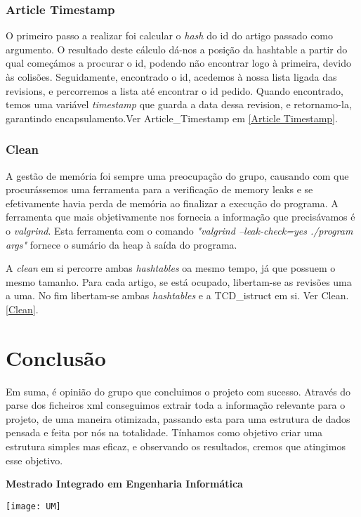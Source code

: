 \documentclass{article}
\begin{document}
\subsubsection{Article Timestamp}
\par O primeiro passo a realizar foi calcular o \emph{hash} do id do artigo passado como argumento. O resultado deste cálculo dá-nos a posição da hashtable a partir do qual começámos a procurar o id, podendo não encontrar logo à primeira, devido às colisões. Seguidamente, encontrado o id, acedemos à nossa lista ligada das revisions, e percorremos a lista até encontrar o id pedido. Quando encontrado, temos uma variável \emph{timestamp} que guarda a data dessa revision, e retornamo-la, garantindo encapsulamento.Ver Article\_Timestamp em \ref{Article Timestamp}.

\subsubsection{Clean}
\par A gestão de memória foi sempre uma preocupação do grupo, causando com que procurássemos uma ferramenta para a verificação de memory leaks e se efetivamente havia perda de memória ao finalizar a execução do programa. A ferramenta que mais objetivamente nos fornecia a informação que precisávamos é o \emph{valgrind}. Esta ferramenta com o comando \emph{"valgrind --leak-check=yes ./program args"} fornece o sumário da heap à saída do programa.
\par A \emph{clean} em si percorre ambas \emph{hashtables} oa mesmo tempo, já que possuem o mesmo tamanho. Para cada artigo, se está ocupado, libertam-se as revisões uma a uma. No fim libertam-se ambas \emph{hashtables} e a TCD\_istruct em si. Ver Clean. \ref{Clean}.

\newpage

\section{Conclusão}
\par Em suma, é opinião do grupo que concluimos o projeto com sucesso. Através do parse dos ficheiros xml conseguimos extrair toda a informação relevante para o projeto, de uma maneira otimizada, passando esta para uma estrutura de dados pensada e feita por nós na totalidade. Tínhamos como objetivo criar uma estrutura simples mas eficaz, e observando os resultados, cremos que atingimos esse objetivo.

\begin{center}
\vfill
\bf Mestrado Integrado em Engenharia Informática
\par
\texttt{[image: UM]}
\end{center}
\end{document}

